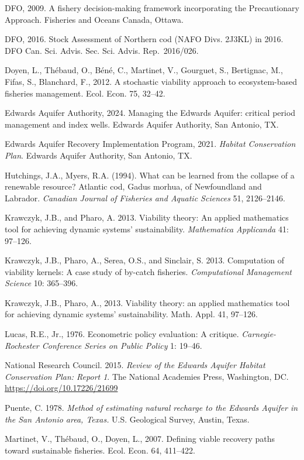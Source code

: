\documentclass[11pt]{article}
\begin{document}
DFO, 2009. A fishery decision-making framework incorporating the
Precautionary Approach. Fisheries and Oceans Canada, Ottawa.

DFO, 2016. Stock Assessment of Northern cod (NAFO Divs. 2J3KL) in 2016.
DFO Can. Sci. Advis. Sec. Sci. Advis. Rep.~2016/026.

Doyen, L., Th\'ebaud, O., B\'en\'e, C., Martinet, V., Gourguet, S., Bertignac,
M., Fifas, S., Blanchard, F., 2012. A stochastic viability approach to
ecosystem-based fisheries management. Ecol. Econ. 75, 32--42.

Edwards Aquifer Authority, 2024. Managing the Edwards Aquifer: critical period management and
index wells. Edwards Aquifer Authority, San Antonio, TX.

Edwards Aquifer Recovery Implementation Program, 2021. \emph{Habitat Conservation Plan}. Edwards Aquifer Authority, San Antonio, TX.

Hutchings, J.A., Myers, R.A. (1994). What can be learned from the
collapse of a renewable resource? Atlantic cod, Gadus morhua, of
Newfoundland and Labrador. \emph{Canadian Journal of Fisheries and
Aquatic Sciences} 51, 2126--2146.

Krawczyk, J.B., and Pharo, A. 2013. Viability theory: An applied
mathematics tool for achieving dynamic systems' sustainability.
\emph{Mathematica Applicanda} 41: 97--126.

Krawczyk, J.B., Pharo, A., Serea, O.S., and Sinclair, S. 2013.
Computation of viability kernels: A case study of by-catch fisheries.
\emph{Computational Management Science} 10: 365--396.


Krawczyk, J.B., Pharo, A., 2013. Viability theory: an applied
mathematics tool for achieving dynamic systems' sustainability. Math.
Appl. 41, 97--126.

Lucas, R.E., Jr., 1976. Econometric policy evaluation: A critique.
\emph{Carnegie-Rochester Conference Series on Public Policy} 1: 19--46.

National Research Council. 2015. \emph{Review of the Edwards Aquifer
Habitat Conservation Plan: Report 1}. The National Academies Press,
Washington, DC. \url{https://doi.org/10.17226/21699}

Puente, C. 1978. \emph{Method of estimating natural recharge to the
Edwards Aquifer in the San Antonio area, Texas.} U.S. Geological Survey,
Austin, Texas.

Martinet, V., Th\'ebaud, O., Doyen, L., 2007. Defining viable recovery
paths toward sustainable fisheries. Ecol. Econ. 64, 411--422.
\end{document}
